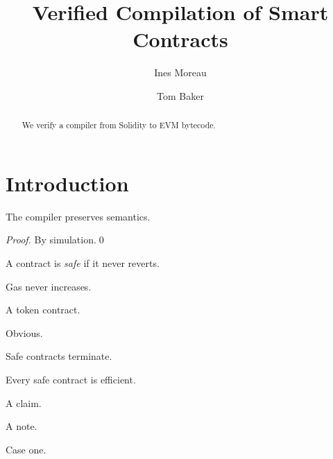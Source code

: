 \documentclass[runningheads]{llncs}
\begin{document}
\title{Verified Compilation of Smart Contracts}
\author{Ines Moreau \and
Tom Baker}
\maketitle

\begin{abstract}
We verify a compiler from Solidity to EVM bytecode.
\end{abstract}

\section{Introduction}
\begin{theorem}
The compiler preserves semantics.
\end{theorem}
\begin{proof}
By simulation.\qed
\end{proof}
\begin{definition}
A contract is \emph{safe} if it never reverts.
\end{definition}
\begin{lemma}[Monotonicity]
Gas never increases.
\end{lemma}
\begin{example}
A token contract.
\end{example}
\begin{remark}
Obvious.
\end{remark}
\begin{corollary}
Safe contracts terminate.
\end{corollary}
\begin{conjecture}
Every safe contract is efficient.
\end{conjecture}
\begin{claim}
A claim.
\end{claim}
\begin{note}
A note.
\end{note}
\begin{case}
Case one.
\end{case}
\end{document}
